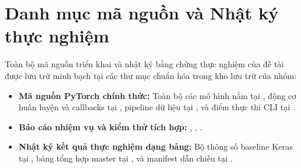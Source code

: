 \documentclass[12pt,a4paper,openany,oneside]{book}
\begin{document}
\frontmatter

\tableofcontents
\listoffigures
\listoftables
\mainmatter





\printbibliography[heading=bibintoc,title={Tài liệu tham khảo}]
\appendix
\chapter{Danh mục mã nguồn và Nhật ký thực nghiệm}
Toàn bộ mã nguồn triển khai và nhật ký bằng chứng thực nghiệm của đề tài được lưu trữ minh bạch tại các thư mục chuẩn hóa trong kho lưu trữ của nhóm:
\begin{itemize}
\item \textbf{Mã nguồn PyTorch chính thức:} Toàn bộ các mô hình nằm tại , động cơ huấn luyện và callbacks tại , pipeline dữ liệu tại , và điểm thực thi CLI tại .
\item \textbf{Báo cáo nhiệm vụ và kiểm thử tích hợp:} , , .
\item \textbf{Nhật ký kết quả thực nghiệm dạng bảng:} Bộ thông số baseline Keras tại , bảng tổng hợp master tại , và manifest dẫn chiếu tại .
\end{itemize}
\end{document}

